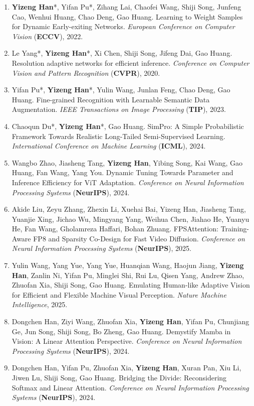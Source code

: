 \documentclass[10.5pt]{article}
\makeatletter
\newlength{\bibhang}
\newlength{\bibsep}
 {\@listi \global\bibsep\itemsep \global\advance\bibsep by\parsep}
\newenvironment{bibsection}%
        {\begin{enumerate}{%
       \setlength{\leftmargin}{-2em}%
       \setlength{\itemindent}{-2em}%
       \setlength{\itemsep}{\bibsep}%
        \setlength{\partopsep}{0pt}%
        \setlength{\topsep}{0pt}}}
        {\end{enumerate}\vspace{-.6\baselineskip}}
\makeatother
\begin{document}
\begin{sloppypar}
\begin{bibsection}
        \item \textbf{Yizeng Han}*, {Yifan Pu*}, Zihang Lai, Chaofei Wang, Shiji Song, Junfeng Cao, Wenhui Huang, Chao Deng, Gao Huang. Learning to Weight Samples for Dynamic Early-exiting Networks. \emph{European Conference on Computer Vision} (\textbf{ECCV}), 2022.
        \item {Le Yang*}, \textbf{Yizeng Han}*, Xi Chen, Shiji Song, Jifeng Dai, Gao Huang. Resolution adaptive networks for efficient inference. \emph{Conference on Computer Vision and Pattern Recognition} (\textbf{CVPR}), 2020.
        \item Yifan Pu*, \textbf{Yizeng Han}*,  Yulin Wang, Junlan Feng, Chao Deng, Gao Huang. Fine-grained Recognition with Learnable Semantic Data Augmentation. \emph{IEEE Transactions on Image Processing} (\textbf{TIP}), 2023.
        \item Chaoqun Du*, \textbf{Yizeng Han}*, Gao Huang. SimPro: A Simple Probabilistic Framework Towards Realistic Long-Tailed Semi-Supervised Learning. \emph{International Conference on Machine Learning} (\textbf{ICML}), 2024.
        \item Wangbo Zhao, Jiasheng Tang, \textbf{Yizeng Han}, Yibing Song, Kai Wang, Gao Huang, Fan Wang, Yang You. Dynamic Tuning Towards Parameter and Inference Efficiency for ViT Adaptation. \emph{Conference on Neural Information Processing Systems} (\textbf{NeurIPS}), 2024.
        \item Akide Liu, Zeyu Zhang, Zhexin Li, Xuehai Bai, Yizeng Han, Jiasheng Tang, Yuanjie Xing, Jichao Wu, Mingyang Yang, Weihua Chen, Jiahao He, Yuanyu He, Fan Wang, Gholamreza Haffari, Bohan Zhuang. FPSAttention: Training-Aware FP8 and Sparsity Co-Design for Fast Video Diffusion. \emph{Conference on Neural Information Processing Systems} (\textbf{NeurIPS}), 2025.
        \item Yulin Wang, Yang Yue, Yang Yue, Huanqian Wang, Haojun Jiang, \textbf{Yizeng Han}, Zanlin Ni, Yifan Pu, Minglei Shi, Rui Lu, Qisen Yang, Andrew Zhao, Zhuofan Xia, Shiji Song, Gao Huang. Emulating Human-like Adaptive Vision for Efficient and Flexible Machine Visual Perception. \emph{Nature Machine Intelligence}, 2025.
        \item Dongchen Han, Ziyi Wang, Zhuofan Xia, \textbf{Yizeng Han}, Yifan Pu, Chunjiang Ge, Jun Song, Shiji Song, Bo Zheng, Gao Huang. Demystify Mamba in Vision: A Linear Attention Perspective. \emph{Conference on Neural Information Processing Systems} (\textbf{NeurIPS}), 2024.
        \item Dongchen Han, Yifan Pu, Zhuofan Xia, \textbf{Yizeng Han}, Xuran Pan, Xiu Li, Jiwen Lu, Shiji Song, Gao Huang. Bridging the Divide: Reconsidering Softmax and Linear Attention. \emph{Conference on Neural Information Processing Systems} (\textbf{NeurIPS}), 2024.

\end{bibsection}
\end{sloppypar}
\end{document}
